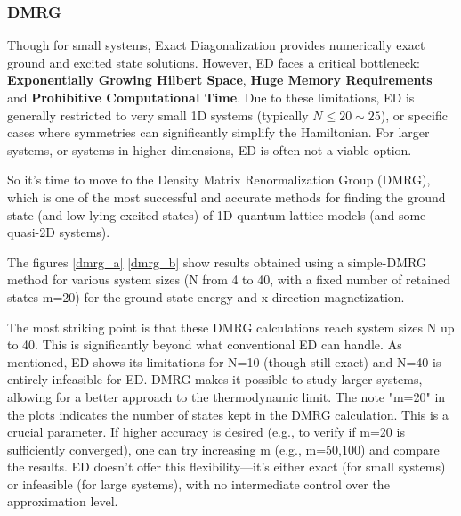 \documentclass[pre,twocolumn,floatfix]{revtex4-1}
\begin{document}
\subsubsection{DMRG}
Though for small systems, Exact Diagonalization provides numerically exact ground and excited state solutions. However, ED faces a critical bottleneck: \textbf{Exponentially Growing Hilbert Space}, \textbf{Huge Memory Requirements} and \textbf{Prohibitive Computational Time}. Due to these limitations, ED is generally restricted to very small 1D systems (typically $N\leq20\sim25$), or specific cases where symmetries can significantly simplify the Hamiltonian. For larger systems, or systems in higher dimensions, ED is often not a viable option.

So it's time to move to the Density Matrix Renormalization Group (DMRG), which is one of the most successful and accurate methods for finding the ground state (and low-lying excited states) of 1D quantum lattice models (and some quasi-2D systems).

The figures \ref{dmrg_a} \ref{dmrg_b} show results obtained using a simple-DMRG method for various system sizes (N from 4 to 40, with a fixed number of retained states m=20) for the ground state energy and x-direction magnetization.

The most striking point is that these DMRG calculations reach system sizes N up to 40. This is significantly beyond what conventional ED can handle. As mentioned, ED shows its limitations for N=10 (though still exact) and N=40 is entirely infeasible for ED. DMRG makes it possible to study larger systems, allowing for a better approach to the thermodynamic limit. The note "m=20" in the plots indicates the number of states kept in the DMRG calculation. This is a crucial parameter. If higher accuracy is desired (e.g., to verify if m=20 is sufficiently converged), one can try increasing m (e.g., m=50,100) and compare the results. ED doesn't offer this flexibility—it's either exact (for small systems) or infeasible (for large systems), with no intermediate control over the approximation level.
\end{document}
